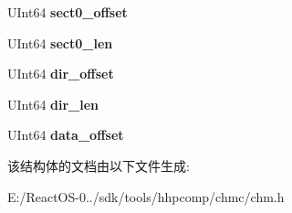 \begin{DoxyCompactItemize}
U\+Int64 {\bfseries sect0\+\_\+offset}
\item 
\mbox{\label{structchmc_itsf_header_aecdc35b43e811d04e10611d440a24a67}} 
U\+Int64 {\bfseries sect0\+\_\+len}
\item 
\mbox{\label{structchmc_itsf_header_a89e61ca7aba24b4efa3133f4e0abafaf}} 
U\+Int64 {\bfseries dir\+\_\+offset}
\item 
\mbox{\label{structchmc_itsf_header_aa57e92cf9dab0b20eb78b39cccc10ccc}} 
U\+Int64 {\bfseries dir\+\_\+len}
\item 
\mbox{\label{structchmc_itsf_header_a91d20f4c19891dfdb4191d67869d5b17}} 
U\+Int64 {\bfseries data\+\_\+offset}
\end{DoxyCompactItemize}


该结构体的文档由以下文件生成\+:\begin{DoxyCompactItemize}
\item 
E\+:/\+React\+O\+S-\/0../sdk/tools/hhpcomp/chmc/chm.\+h\end{DoxyCompactItemize}
